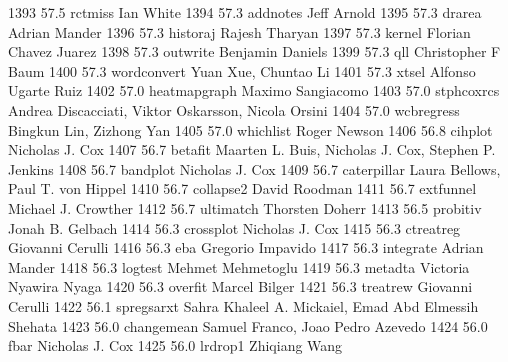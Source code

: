  1393     57.5    rctmiss       Ian White                               
  1394     57.3    addnotes      Jeff Arnold                             
  1395     57.3    drarea        Adrian Mander                           
  1396     57.3    historaj      Rajesh Tharyan                          
  1397     57.3    kernel        Florian Chavez Juarez                   
  1398     57.3    outwrite      Benjamin Daniels                        
  1399     57.3    qll           Christopher F Baum                      
  1400     57.3    wordconvert   Yuan Xue, Chuntao Li                    
  1401     57.3    xtsel         Alfonso Ugarte Ruiz                     
  1402     57.0    heatmapgraph  Maximo Sangiacomo                       
  1403     57.0    stphcoxrcs    Andrea Discacciati, Viktor Oskarsson,   
                                   Nicola Orsini                           
  1404     57.0    wcbregress    Bingkun Lin, Zizhong Yan                
  1405     57.0    whichlist     Roger Newson                            
  1406     56.8    cihplot       Nicholas J. Cox                         
  1407     56.7    betafit       Maarten L. Buis, Nicholas J. Cox,       
                                   Stephen P. Jenkins                      
  1408     56.7    bandplot      Nicholas J. Cox                         
  1409     56.7    caterpillar   Laura Bellows, Paul T. von Hippel       
  1410     56.7    collapse2     David Roodman                           
  1411     56.7    extfunnel     Michael J. Crowther                     
  1412     56.7    ultimatch     Thorsten Doherr                         
  1413     56.5    probitiv      Jonah B. Gelbach                        
  1414     56.3    crossplot     Nicholas J. Cox                         
  1415     56.3    ctreatreg     Giovanni Cerulli                        
  1416     56.3    eba           Gregorio Impavido                       
  1417     56.3    integrate     Adrian Mander                           
  1418     56.3    logtest       Mehmet Mehmetoglu                       
  1419     56.3    metadta       Victoria Nyawira Nyaga                  
  1420     56.3    overfit       Marcel Bilger                           
  1421     56.3    treatrew      Giovanni Cerulli                        
  1422     56.1    spregsarxt    Sahra Khaleel A. Mickaiel, Emad Abd     
                                   Elmessih Shehata                        
  1423     56.0    changemean    Samuel Franco, Joao Pedro Azevedo       
  1424     56.0    fbar          Nicholas J. Cox                         
  1425     56.0    lrdrop1       Zhiqiang Wang                           
